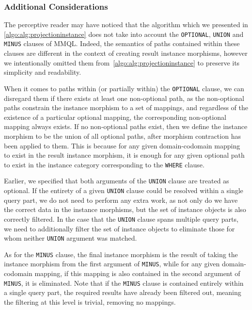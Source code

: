 \subsubsection{Additional Considerations}

The perceptive reader may have noticed that the algorithm which we presented in \cref{algo:alg:projectioninstance} does not take into account the \texttt{OPTIONAL}, \texttt{UNION} and \texttt{MINUS} clauses of MMQL.
Indeed, the semantics of paths contained within these clauses are different in the context of creating result instance morphisms, however we intentionally omitted them from~\cref{algo:alg:projectioninstance} to preserve its simplicity and readability.

When it comes to paths within (or partially within) the \texttt{OPTIONAL} clause, we can disregard them if there exists at least one non-optional path, as the non-optional paths constrain the instance morphism to a set of mappings, and regardless of the existence of a particular optional mapping, the corresponding non-optional mapping always exists.
If no non-optional paths exist, then we define the instance morphism to be the union of all optional paths, after morphism contraction has been applied to them.
This is because for any given domain-codomain mapping to exist in the result instance morphism, it is enough for any given optional path to exist in the instance category corresponding to the \texttt{WHERE} clause.

Earlier, we specified that both arguments of the \texttt{UNION} clause are treated as optional.
If the entirety of a given \texttt{UNION} clause could be resolved within a single query part, we do not need to perform any extra work, as not only do we have the correct data in the instance morphisms, but the set of instance objects is also correctly filtered.
In the case that the \texttt{UNION} clause spans multiple query parts, we need to additionally filter the set of instance objects to eliminate those for whom neither \texttt{UNION} argument was matched.

As for the \texttt{MINUS} clause, the final instance morphism is the result of taking the instance morphism from the first argument of \texttt{MINUS}, while for any given domain-codomain mapping, if this mapping is also contained in the second argument of \texttt{MINUS}, it is eliminated.
Note that if the \texttt{MINUS} clause is contained entirely within a single query part, the required results have already been filtered out, meaning the filtering at this level is trivial, removing no mappings.

